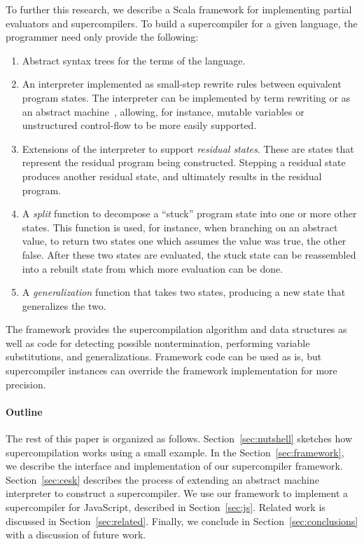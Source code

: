 To further this research,
we describe a Scala framework for implementing 
partial evaluators and supercompilers.
To build a supercompiler for a given language, the programmer
need only provide the following:
\begin{enumerate}
\item Abstract syntax trees for the terms of the language.
\item An interpreter implemented as small-step rewrite rules
between equivalent program states. 
The interpreter can be implemented by term rewriting or as
an abstract machine~\cite{danvy,cesk}, allowing, for instance,
mutable variables or unstructured control-flow to be more easily supported.
\item Extensions of the interpreter to 
support \emph{residual states}. These are states that represent 
the residual program being constructed.
Stepping a residual state produces another residual state, and
ultimately results in the residual program.
\item A \emph{split} function to decompose a ``stuck'' program state into
one or more other states.
This function is used, for instance, when branching on an abstract value,
to return two states one which assumes the value was true, the other false.
After these two states are evaluated, the stuck state can be reassembled
into a rebuilt state from which more evaluation can be done.
\item A \emph{generalization} function 
that takes two states, producing a new state that generalizes the two.
\end{enumerate}

The framework provides the supercompilation algorithm and data structures
as well as code for detecting possible nontermination,
performing variable substitutions, and generalizations. Framework
code can be used as is, but supercompiler instances can override
the framework implementation for more precision. 

\paragraph*{Outline}
The rest of this paper is organized as follows.
Section~\ref{sec:nutshell} sketches how supercompilation works using
a small example.
In the Section~\ref{sec:framework}, we describe the interface
and implementation of our supercompiler framework.
Section~\ref{sec:cesk} describes the process of extending an abstract machine interpreter
to construct a supercompiler.
We use our framework to implement a supercompiler for JavaScript,
described in Section~\ref{sec:js}.
Related work is discussed in Section~\ref{sec:related}.
Finally, we conclude in Section~\ref{sec:conclusions} with a discussion of
future work.

